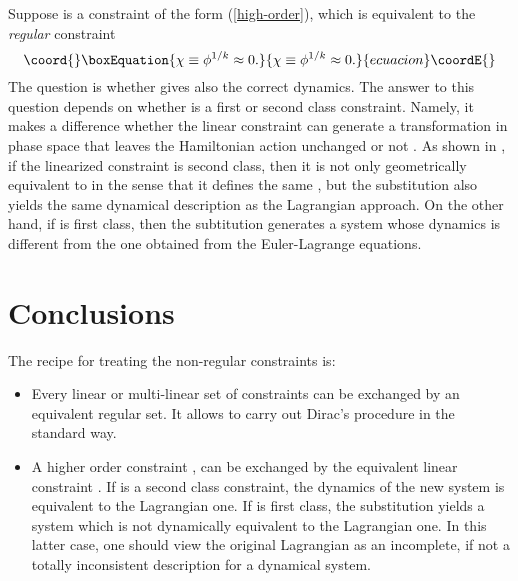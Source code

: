 \documentclass[a4paper,thmsa,11pt]{article}
\begin{document}
Suppose \coordHE{} is a constraint of the form (\ref{high-order}),
which is equivalent to the \emph{regular} constraint
\begin{equation}\coord{}\boxEquation{
\chi \equiv \phi ^{1/k}\approx 0.
}{
\chi \equiv \phi ^{1/k}\approx 0.
}{ecuacion}\coordE{}\end{equation}
The question is whether \coordHE{} gives also the correct dynamics.
The answer to this question depends on whether \myHighlight{$\chi $}\coordHE{} is a first or second
class constraint. Namely, it makes a difference whether the linear
constraint \myHighlight{$\chi $}\coordHE{} can generate a transformation in phase space that leaves
the Hamiltonian action unchanged or not . As shown in \cite{Miskovic-Zanelli}%
, if the linearized constraint \myHighlight{$\chi $}\coordHE{} is second class, then it is not only
geometrically equivalent to \myHighlight{$\phi $}\coordHE{} in the sense that it defines the same \myHighlight{$%
\Sigma $}\coordHE{}, but the substitution also yields the same dynamical description as
the Lagrangian approach. On the other hand, if \myHighlight{$\chi $}\coordHE{} is first class, then
the subtitution generates a system whose dynamics is different from the one
obtained from the Euler-Lagrange equations.


\section{Conclusions}

The recipe for treating the non-regular constraints is:

\begin{itemize}
\item  Every linear or multi-linear set of constraints can be exchanged by
an equivalent regular set. It allows to carry out Dirac's procedure in the
standard way.

\item  A higher order constraint \coordHE{}, can be exchanged by the equivalent linear constraint \coordHE{}. If \myHighlight{$\chi $}\coordHE{} is a second class constraint, the
dynamics of the new system is equivalent to the Lagrangian one. If \myHighlight{$\chi $}\coordHE{}
is first class, the substitution yields a system which is not dynamically
equivalent to the Lagrangian one. In this latter case, one should view the
original Lagrangian as an incomplete, if not a totally inconsistent
description for a dynamical system.
\end{itemize}
\end{document}
